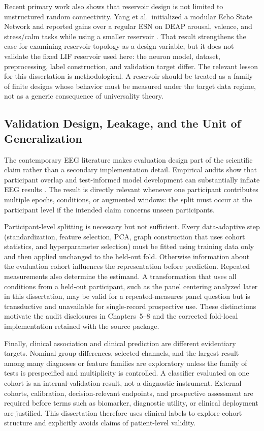 Recent primary work also shows that reservoir design is not limited to unstructured random connectivity. Yang et al.\ initialized a modular Echo State Network and reported gains over a regular ESN on DEAP arousal, valence, and stress/calm tasks while using a smaller reservoir \cite{yang_modular_esn_2024}. That result strengthens the case for examining reservoir topology as a design variable, but it does not validate the fixed LIF reservoir used here: the neuron model, dataset, preprocessing, label construction, and validation target differ. The relevant lesson for this dissertation is methodological. A reservoir should be treated as a family of finite designs whose behavior must be measured under the target data regime, not as a generic consequence of universality theory.

\subsection{Validation Design, Leakage, and the Unit of Generalization}
The contemporary EEG literature makes evaluation design part of the scientific claim rather than a secondary implementation detail. Empirical audits show that participant overlap and test-informed model development can substantially inflate EEG results \cite{lee_eeg_leakage_2023,brookshire_eeg_leakage_2024,kinahan_eeg_reproducibility_2024}. The result is directly relevant whenever one participant contributes multiple epochs, conditions, or augmented windows: the split must occur at the participant level if the intended claim concerns unseen participants.

Participant-level splitting is necessary but not sufficient. Every data-adaptive step (standardization, feature selection, PCA, graph construction that uses cohort statistics, and hyperparameter selection) must be fitted using training data only and then applied unchanged to the held-out fold. Otherwise information about the evaluation cohort influences the representation before prediction. Repeated measurements also determine the estimand. A transformation that uses all conditions from a held-out participant, such as the panel centering analyzed later in this dissertation, may be valid for a repeated-measures panel question but is transductive and unavailable for single-record prospective use. These distinctions motivate the audit disclosures in Chapters~5--8 and the corrected fold-local implementation retained with the source package.

Finally, clinical association and clinical prediction are different evidentiary targets. Nominal group differences, selected channels, and the largest result among many diagnoses or feature families are exploratory unless the family of tests is prespecified and multiplicity is controlled. A classifier evaluated on one cohort is an internal-validation result, not a diagnostic instrument. External cohorts, calibration, decision-relevant endpoints, and prospective assessment are required before terms such as biomarker, diagnostic utility, or clinical deployment are justified. This dissertation therefore uses clinical labels to explore cohort structure and explicitly avoids claims of patient-level validity.

